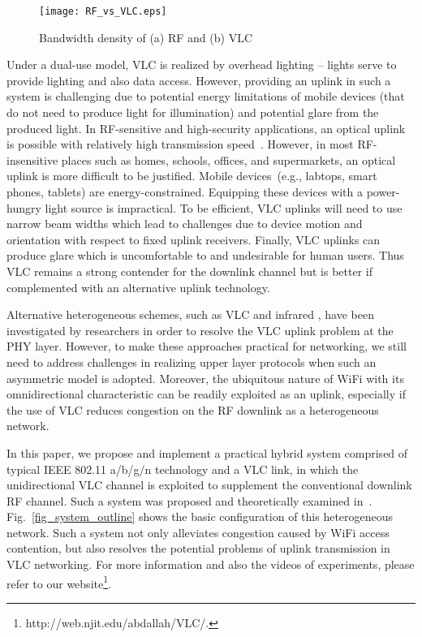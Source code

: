 \documentclass[10pt,journal]{IEEEtran}
\begin{document}
\begin{figure}
\centering
\texttt{[image: RF\_vs\_VLC.eps]}
\caption{Bandwidth density of (a) RF and (b) VLC}
\label{fig_RF_VS_VLC}
\end{figure}

Under a dual-use model, VLC is realized by overhead lighting -- lights
serve to provide lighting and also data access. However, providing an
uplink in such a system is challenging due to potential energy
limitations of mobile devices (that do not need to produce
light for illumination) and potential glare from the produced light.
In RF-sensitive and high-security applications, an optical uplink is
possible with relatively high transmission
speed~\cite{schmid2013led}. However, in most RF-insensitive places
such as homes, schools, offices, and supermarkets, an optical uplink
is more difficult to be justified. Mobile devices~(e.g., labtops, smart
phones, tablets) are energy-constrained. Equipping these devices with
a power-hungry light source is impractical. To be efficient, VLC
uplinks will need to use narrow beam widths which lead to challenges
due to device motion and orientation with respect to fixed uplink
receivers. Finally, VLC uplinks can produce glare which is
uncomfortable to and undesirable for human users. Thus VLC remains a
strong contender for the downlink channel but is better if
complemented with an alternative uplink technology.

Alternative heterogeneous schemes, such as VLC and infrared
\cite{langer2007recent}, have been investigated by researchers in
order to resolve the VLC uplink problem at the PHY layer. However, to
make these approaches practical for networking, we still need to address challenges
in realizing upper layer protocols when such an asymmetric model is
adopted. Moreover, the ubiquitous nature of WiFi with its
omnidirectional characteristic can be readily exploited as an
uplink, especially if the use of VLC reduces congestion on the RF downlink
as a heterogeneous network.

In this paper, we propose and implement a practical hybrid system
comprised of typical IEEE 802.11 a/b/g/n technology and a VLC link, in
which the unidirectional VLC channel is exploited to supplement the
conventional downlink RF channel. Such a system was proposed and
theoretically examined in~\cite{rahaim2011hybrid}. Fig.~\ref{fig_system_outline} shows the basic
configuration of this heterogeneous network.  Such a system not only
alleviates congestion caused by WiFi access contention, but also
resolves the potential problems of uplink transmission in VLC
networking. For more information and also the videos of experiments,
please refer to our website\footnote{http://web.njit.edu/abdallah/VLC/.}.
\end{document}
